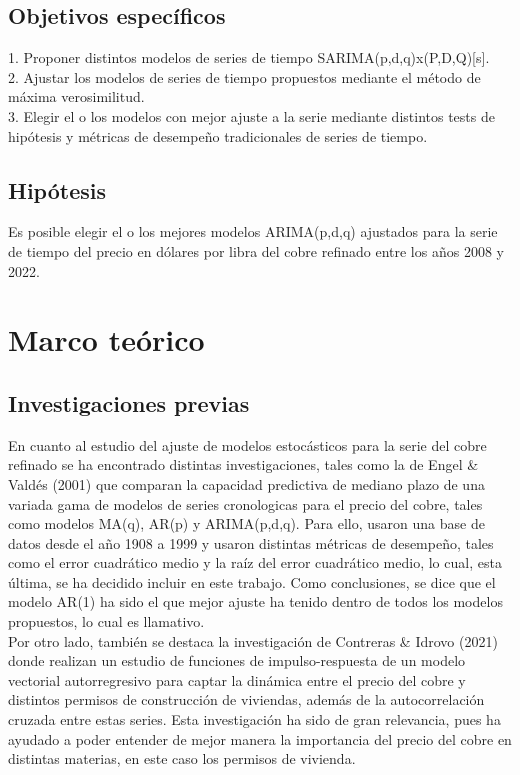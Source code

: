 \documentclass{report}
\begin{document}
\section{Objetivos específicos}\label{objetivos específicos}
1. Proponer distintos modelos de series de tiempo SARIMA(p,d,q)x(P,D,Q)[s].\\

2. Ajustar los modelos de series de tiempo propuestos mediante el método de máxima verosimilitud.\\

3. Elegir el o los modelos con mejor ajuste a la serie mediante distintos tests de hipótesis y métricas de desempeño tradicionales de series de tiempo.\\

\section{Hipótesis}\label{hipótesis}
Es posible elegir el o los mejores modelos ARIMA(p,d,q) ajustados para la serie de tiempo del precio en dólares por libra del cobre refinado entre los años 2008 y 2022.
\chapter{Marco teórico} \label{Marco}
\section{Investigaciones previas}
En cuanto al estudio del ajuste de modelos estocásticos para la serie del cobre refinado se ha encontrado distintas investigaciones, tales como la de Engel \& Valdés (2001) que comparan la capacidad predictiva de mediano plazo de una variada gama de modelos de series cronologicas para el precio del cobre, tales como modelos MA(q), AR(p) y ARIMA(p,d,q). Para ello, usaron una base de datos desde el año 1908 a 1999 y usaron distintas métricas de desempeño, tales como el error cuadrático medio y la raíz del error cuadrático medio, lo cual, esta última, se ha decidido incluir en este trabajo. Como conclusiones, se dice que el modelo AR(1) ha sido el que mejor ajuste ha tenido dentro de todos los modelos propuestos, lo cual es llamativo.\\

Por otro lado, también se destaca la investigación de Contreras \& Idrovo (2021) donde realizan un estudio de funciones de impulso-respuesta de un modelo vectorial autorregresivo para captar la dinámica entre el precio del cobre y distintos permisos de construcción de viviendas, además de la autocorrelación cruzada entre estas series. Esta investigación ha sido de gran relevancia, pues ha ayudado a poder entender de mejor manera la importancia del precio del cobre en distintas materias, en este caso los permisos de vivienda. \\
\end{document}
